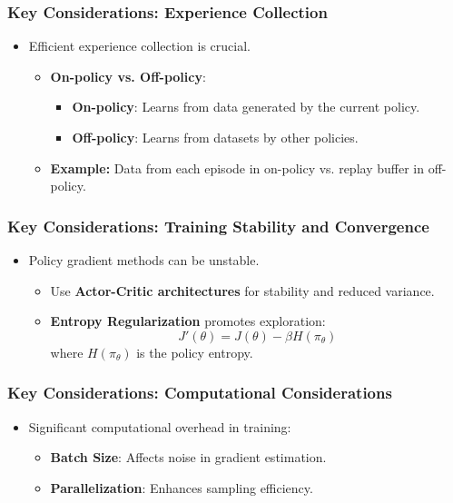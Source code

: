 \documentclass[aspectratio=169]{beamer}
\begin{document}
\begin{frame}
    \frametitle{Key Considerations: Experience Collection}
    \begin{itemize}
        \item Efficient experience collection is crucial.
        \begin{itemize}
            \item \textbf{On-policy vs. Off-policy}:
            \begin{itemize}
                \item \textbf{On-policy}: Learns from data generated by the current policy.
                \item \textbf{Off-policy}: Learns from datasets by other policies.
            \end{itemize}
            \item \textbf{Example:} Data from each episode in on-policy vs. replay buffer in off-policy.
        \end{itemize}
    \end{itemize}
\end{frame}

\begin{frame}
    \frametitle{Key Considerations: Training Stability and Convergence}
    \begin{itemize}
        \item Policy gradient methods can be unstable.
        \begin{itemize}
            \item Use \textbf{Actor-Critic architectures} for stability and reduced variance.
            \item \textbf{Entropy Regularization} promotes exploration:
            \begin{equation}
            J'(\theta) = J(\theta) - \beta H(\pi_\theta)
            \end{equation}
            where \( H(\pi_\theta) \) is the policy entropy.
        \end{itemize}
    \end{itemize}
\end{frame}

\begin{frame}
    \frametitle{Key Considerations: Computational Considerations}
    \begin{itemize}
        \item Significant computational overhead in training:
        \begin{itemize}
            \item \textbf{Batch Size}: Affects noise in gradient estimation.
            \item \textbf{Parallelization}: Enhances sampling efficiency.
        \end{itemize}
    \end{itemize}
\end{frame}
\end{document}
